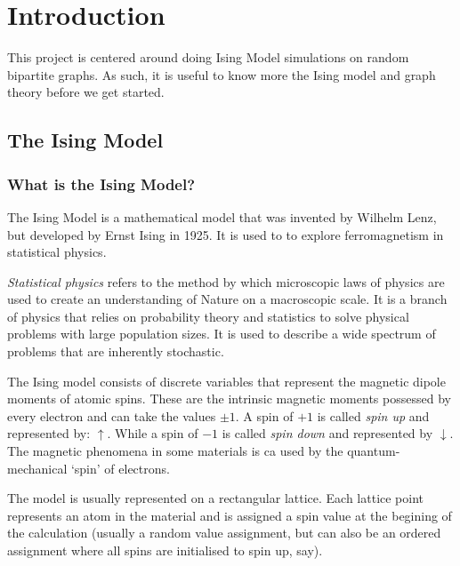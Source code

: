 \documentclass[pdftex,12pt,a4paper]{article}
\begin{document}

\tableofcontents

\newpage
{}



\section{Introduction}

This project is centered around doing Ising Model simulations on random bipartite graphs. As such, it is useful to know more the Ising model and graph theory before we get started.


\subsection{The Ising Model}



\subsubsection{What is the Ising Model?}

The Ising Model is a mathematical model that was invented by Wilhelm Lenz, but developed by Ernst Ising in 1925. It is used to to explore ferromagnetism in statistical physics.

\emph{Statistical physics} refers to the method by which microscopic laws of physics are used to create an understanding of Nature on a macroscopic scale. It is a branch of physics that relies on probability theory and statistics to solve physical problems with large population sizes. It is used to describe a wide spectrum of problems that are inherently stochastic.

The Ising model consists of discrete variables that represent the magnetic dipole moments of atomic spins. These are the intrinsic magnetic moments possessed by every electron and can take the values $\pm1$. A spin of $+1$ is called \emph{spin up} and represented by: $\uparrow$. While a spin of $-1$ is called \emph{spin down} and represented by $\downarrow$. The magnetic phenomena in some materials is ca
used by the quantum-mechanical ‘spin’ of electrons.

The model is usually represented on a rectangular lattice. Each lattice point represents an atom in the material and is assigned a spin value at the begining of the calculation (usually a random value assignment, but can also be an ordered assignment where all spins are initialised to spin up, say).
\end{document}
